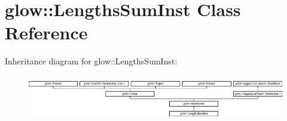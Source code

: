 \hypertarget{classglow_1_1_lengths_sum_inst}{}\section{glow\+:\+:Lengths\+Sum\+Inst Class Reference}
\label{classglow_1_1_lengths_sum_inst}
Inheritance diagram for glow\+:\+:Lengths\+Sum\+Inst\+:\begin{figure}[H]
\begin{center}
\leavevmode
\includegraphics[height=1.991111cm]{classglow_1_1_lengths_sum_inst}
\end{center}
\end{figure}
